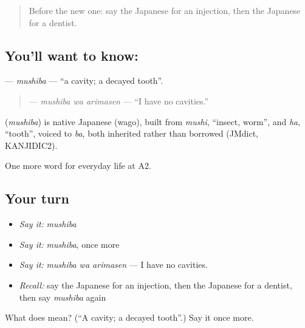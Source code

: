 \label{lesson:JA-C217-mushiba}



\begin{quote}
Before the new one: say the Japanese for an injection, then the Japanese for a dentist.
\end{quote}

\subsection*{You'll want to know: }
\textbf{} — \emph{mushiba} — \textquotedblleft{}a cavity; a decayed tooth\textquotedblright{}.

\begin{quote}
\textbf{ } — \emph{mushiba wa arimasen} — \textquotedblleft{}I have no cavities.\textquotedblright{}
\end{quote}

\begin{cousinweb}
\textbf{} (\emph{mushiba}) is native Japanese (wago), built from \emph{mushi}, \textquotedblleft{}insect, worm\textquotedblright{}, and \emph{ha}, \textquotedblleft{}tooth\textquotedblright{}, voiced to \emph{ba}, both inherited rather than borrowed (JMdict, KANJIDIC2).
\end{cousinweb}

\begin{grammarlens}[title={What you've built}]
One more word for everyday life at A2.
\end{grammarlens}

\subsection*{Your turn}
\begin{itemize}
\raggedright
  \item \emph{Say it:} \emph{mushiba}
  \item \emph{Say it:} \emph{mushiba}, once more
  \item \emph{Say it:} \emph{mushiba wa arimasen} — I have no cavities.
  \item \emph{Recall:} say the Japanese for an injection, then the Japanese for a dentist, then say \emph{mushiba} again
\end{itemize}

\begin{tcolorbox}[breakable,colback=teal!4,colframe=teal!35!black,title={Before you move on}]
What does  mean? (\textquotedblleft{}A cavity; a decayed tooth\textquotedblright{}.) Say it once more.
\end{tcolorbox}
